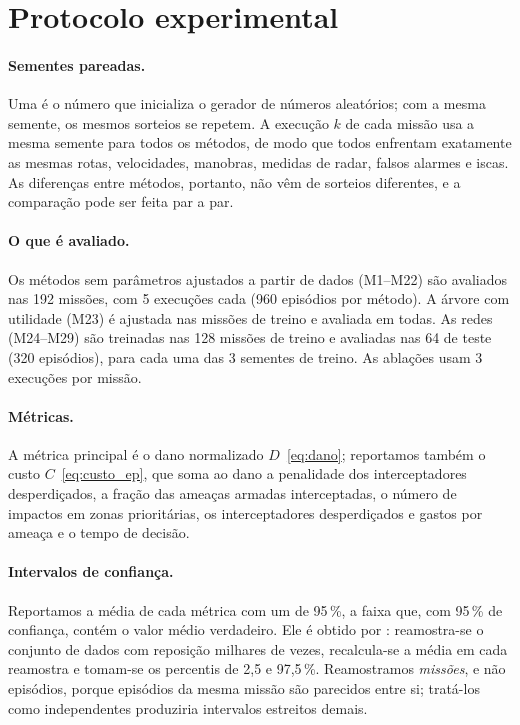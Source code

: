 \section{Protocolo experimental}\label{sec:protocolo}

\paragraph{Sementes pareadas.} Uma  é o número que inicializa o gerador de números aleatórios; com a
mesma semente, os mesmos sorteios se repetem. A execução $k$ de cada missão usa a mesma semente para todos os métodos, de
modo que todos enfrentam exatamente as mesmas rotas, velocidades, manobras, medidas de radar, falsos alarmes e iscas. As
diferenças entre métodos, portanto, não vêm de sorteios diferentes, e a comparação pode ser feita par a par.

\paragraph{O que é avaliado.} Os métodos sem parâmetros ajustados a partir de dados (M1--M22) são avaliados nas 192
missões, com 5 execuções cada (960 episódios por método). A árvore com utilidade (M23) é ajustada nas missões de treino
e avaliada em todas. As redes (M24--M29) são treinadas nas 128 missões de treino e avaliadas nas 64 de teste (320
episódios), para cada uma das 3 sementes de treino. As ablações usam 3 execuções por missão.

\paragraph{Métricas.} A métrica principal é o dano normalizado $D$~\eqref{eq:dano}; reportamos também o custo
$C$~\eqref{eq:custo_ep}, que soma ao dano a penalidade dos interceptadores desperdiçados, a fração das ameaças armadas
interceptadas, o número de impactos em zonas prioritárias, os interceptadores desperdiçados e gastos por ameaça e o tempo
de decisão.

\paragraph{Intervalos de confiança.} Reportamos a média de cada métrica com um  de
95\,\%, a faixa que, com 95\,\% de confiança, contém o valor médio verdadeiro. Ele é obtido por
: reamostra-se o conjunto de dados com reposição milhares de vezes, recalcula-se a média em
cada reamostra e tomam-se os percentis de 2,5 e 97,5\,\%. Reamostramos \emph{missões}, e não episódios, porque episódios
da mesma missão são parecidos entre si; tratá-los como independentes produziria intervalos estreitos demais.

